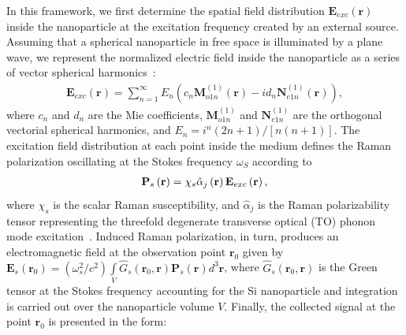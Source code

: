         In this framework, we first determine the spatial field distribution $\mathbf{E}_{exc}(\mathbf{r})$
        inside the nanoparticle at the excitation frequency created by an external source. Assuming that a
        spherical nanoparticle in free space is illuminated by a plane wave, we represent the normalized
        electric field inside the nanoparticle as a series of vector spherical harmonics~\cite{bohren1983absorption}:
        \begin{align}
            \mathbf{E}_{exc}(\mathbf{r})=\sum\nolimits_{n=1}^\infty E_n \left(c_n\mathbf{M}_{o1n}^{(1)}(\mathbf{r}) -
            i{d_n}\mathbf{N}_{e1n}^{(1)}(\mathbf{r})\right) ,
            \label{eq1}
        \end{align}
        where $c_n$ and $d_n$ are the Mie coefficients, ${{\mathbf{M}}_{o1n}^{(1)}}$ and ${{\mathbf{N}}_{e1n}^{(1)}}$ are
        the orthogonal vectorial spherical harmonics, and ${E_n} = {i^n}(2n + 1)/[n(n + 1)]$. The excitation field distribution
        at each point inside the medium defines the Raman polarization oscillating at the Stokes frequency $\omega_S$ according to
        \begin{align}
            {{\bf{P}}_s}\left( {\bf{r}} \right) = {\chi _s}\hat \alpha_j \left( {\bf{r}} \right){{\bf{E}}_{exc}}\left( {\bf{r}} \right),
            \label{eq2}
        \end{align}
        where $\chi_s$ is the scalar Raman susceptibility, and $\hat \alpha_j$ is the Raman polarizability tensor representing
        the threefold degenerate transverse optical (TO) phonon mode excitation~\cite{ralston1970spontaneous, peter2010fundamentals}.
        Induced Raman polarization, in turn, produces an electromagnetic field at the observation point
        $\mathbf{r}_0$ given by $\mathbf{E}_s(\mathbf{r}_0) = (\omega_s^2/c^2)\int\limits_V {{{\hat G}_s}\left( {{{\mathbf{r}}_0},{\mathbf{r}}} \right){{\mathbf{P}}_s}\left( {\mathbf{r}} \right){d^3}{\mathbf{r}}}$,
        where  ${\hat G_s}\left( {{{\mathbf{r}}_0},{\mathbf{r}}} \right)$ is the Green tensor at the Stokes frequency accounting
        for the Si nanoparticle and integration is carried out over the nanoparticle volume $V$. Finally, the collected signal at
        the point $\mathbf{r}_0$ is presented in the form:
